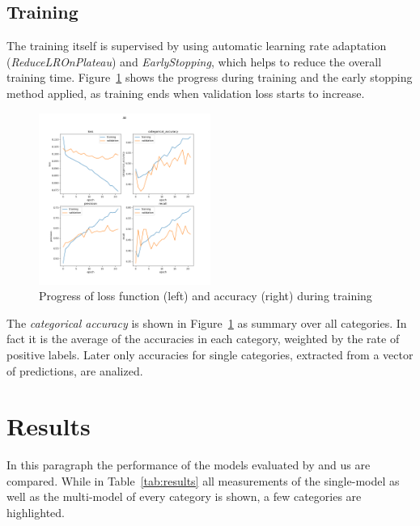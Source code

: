 \documentclass[11pt,a4paper]{article}
\begin{document}
\subsection{Training}

The training itself is supervised by using automatic learning rate adaptation (\textit{ReduceLROnPlateau}) and \textit{EarlyStopping}, which helps to reduce the overall training time.
Figure~\ref{fig:training_loss} shows the progress during training and the early stopping method applied, as training ends when validation loss starts to increase.

\begin{figure}[h!]
	\centering
	\includegraphics[trim={1.4cm 12.4cm 2cm 2.5cm},clip,width=0.5\textwidth]{img/training_All_22}
	\caption{Progress of loss function (left) and accuracy (right) during training}
	\label{fig:training_loss}
\end{figure}

The \textit{categorical accuracy} is shown in Figure~\ref{fig:training_loss} as summary over all categories. In fact it is the average of the accuracies in each category, weighted by the rate of positive labels. Later only accuracies for single categories, extracted from a vector of predictions, are analized.


\section{Results}
In this paragraph the performance of the models evaluated by  and us are compared.
While in Table~\ref{tab:results} all measurements of the single-model as well as the multi-model of every category is shown, a few categories are highlighted.
\end{document}
